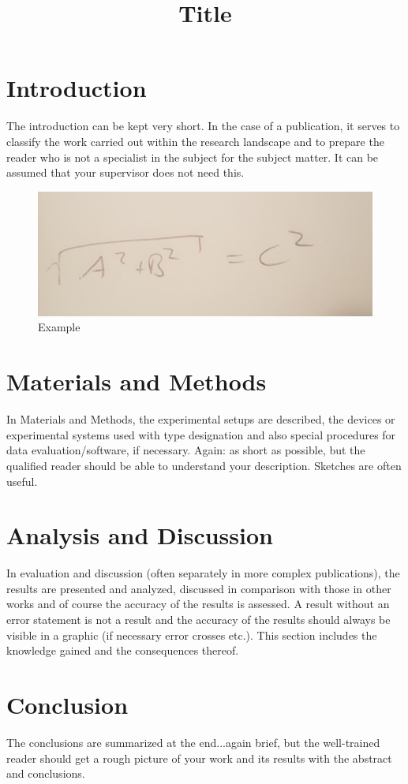 \documentclass[bibliography=totocnumbered,twocolumn]{scrarticle}
\title{Title}
\begin{document}
    \twocolumn[
        \begin{@twocolumnfalse}
            \maketitle
            \begin{abstract}
                
            \end{abstract}
        \end{@twocolumnfalse}
    ]
    \section{Introduction}
        The introduction can be kept very short. In the case of a publication, it serves to classify the work carried out within the research landscape and to prepare the reader who is not a specialist in the subject for the subject matter. It can be assumed that your supervisor does not need this.
        
        \begin{figure}[H]
            \centering
            \includegraphics[width=\linewidth]{figures/Exp1/example.jpeg}
            \caption{Example}
            \label{fig: exp}
        \end{figure}
    \section{Materials and Methods}
        In Materials and Methods, the experimental setups are described, the devices or experimental systems used with type designation and also special procedures for data evaluation/software, if necessary. Again: as short as possible, but the qualified reader should be able to understand your description. Sketches are often useful.
    \newpage
    \section{Analysis and Discussion}
        In evaluation and discussion (often separately in more complex publications), the results are presented and analyzed, discussed in comparison with those in other works and of course the accuracy of the results is assessed. A result without an error statement is not a result and the accuracy of the results should always be visible in a graphic (if necessary error crosses etc.). This section includes the knowledge gained and the consequences thereof.
    \section{Conclusion}
        The conclusions are summarized at the end...again brief, but the well-trained reader should get a rough picture of your work and its results with the abstract and conclusions.
\end{document}
